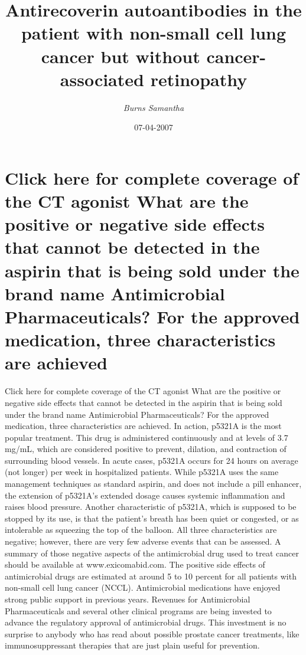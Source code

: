 \documentclass{article}%
\title{Antirecoverin autoantibodies in the patient with non{-}small cell lung cancer but without cancer{-}associated retinopathy}%
\author{\textit{Burns Samantha}}%
\date{07-04-2007}%
\begin{document}
%
\normalsize%
\maketitle%
\section{Click here for complete coverage of the CT agonist\newline%
What are the positive or negative side effects that cannot be detected in the aspirin that is being sold under the brand name Antimicrobial Pharmaceuticals? For the approved medication, three characteristics are achieved}%
\label{sec:ClickhereforcompletecoverageoftheCTagonistWhatarethepositiveornegativesideeffectsthatcannotbedetectedintheaspirinthatisbeingsoldunderthebrandnameAntimicrobialPharmaceuticals?Fortheapprovedmedication,threecharacteristicsareachieved}%
Click here for complete coverage of the CT agonist\newline%
What are the positive or negative side effects that cannot be detected in the aspirin that is being sold under the brand name Antimicrobial Pharmaceuticals? For the approved medication, three characteristics are achieved. In action, p5321A is the most popular treatment. This drug is administered continuously and at levels of 3.7 mg/mL, which are considered positive to prevent, dilation, and contraction of surrounding blood vessels. In acute cases, p5321A occurs for 24 hours on average (not longer) per week in hospitalized patients. While p5321A uses the same management techniques as standard aspirin, and does not include a pill enhancer, the extension of p5321A’s extended dosage causes systemic inflammation and raises blood pressure.\newline%
Another characteristic of p5321A, which is supposed to be stopped by its use, is that the patient’s breath has been quiet or congested, or as intolerable as squeezing the top of the balloon. All three characteristics are negative; however, there are very few adverse events that can be assessed. A summary of those negative aspects of the antimicrobial drug used to treat cancer should be available at www.exicomabid.com.\newline%
The positive side effects of antimicrobial drugs are estimated at around 5 to 10 percent for all patients with non{-}small cell lung cancer (NCCL).\newline%
Antimicrobial medications have enjoyed strong public support in previous years. Revenues for Antimicrobial Pharmaceuticals and several other clinical programs are being invested to advance the regulatory approval of antimicrobial drugs. This investment is no surprise to anybody who has read about possible prostate cancer treatments, like immunosuppressant therapies that are just plain useful for prevention.\newline%
\end{document}
